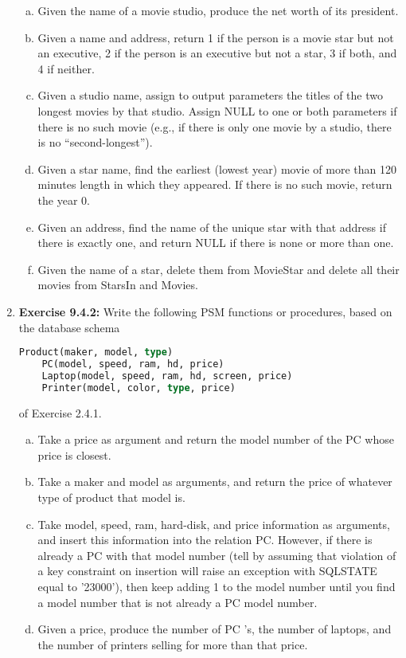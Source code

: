 \documentclass[12pt]{article}
\begin{document}
\begin{enumerate}[1.]
    \begin{enumerate}[a)]
        \item Given the name of a movie studio, produce the net worth of its president.
        \item Given a name and address, return 1 if the person is a movie star but not an executive, 2 if the person is an executive but not a star, 3 if both, and 4 if neither.
        \item Given a studio name, assign to output parameters the titles of the two longest movies by that studio. Assign NULL to one or both parameters if there is no such movie (e.g., if there is only one movie by a studio, there is no “second-longest”).
        \item Given a star name, find the earliest (lowest year) movie of more than 120 minutes length in which they appeared. If there is no such movie, return the year 0.
        \item Given an address, find the name of the unique star with that address if there is exactly one, and return NULL if there is none or more than one.
        \item Given the name of a star, delete them from MovieStar and delete all their movies from StarsIn and Movies.
    \end{enumerate}

    \item \textbf{Exercise 9.4.2:} Write the following PSM functions or procedures,
    based on the database schema

    \bigskip

    \begin{lstlisting}[language=SQL]
    Product(maker, model, type)
    PC(model, speed, ram, hd, price)
    Laptop(model, speed, ram, hd, screen, price)
    Printer(model, color, type, price)
    \end{lstlisting}

    \bigskip

    of Exercise 2.4.1.

    \bigskip

    \begin{enumerate}[a)]
        \item Take a price as argument and return the model number of the PC whose price is closest.
        \item Take a maker and model as arguments, and return the price of whatever type of product that model is.
        \item Take model, speed, ram, hard-disk, and price information as arguments, and insert this information into the relation PC. However, if there is already a PC with that model number (tell by assuming that violation of a key constraint on insertion will raise an exception with SQLSTATE equal to ’23000’), then keep adding 1 to the model number until you find a model number that is not already a PC model number.
        \item Given a price, produce the number of PC ’s, the number of laptops, and the number of printers selling for more than that price.
    \end{enumerate}


\end{enumerate}
\end{document}
